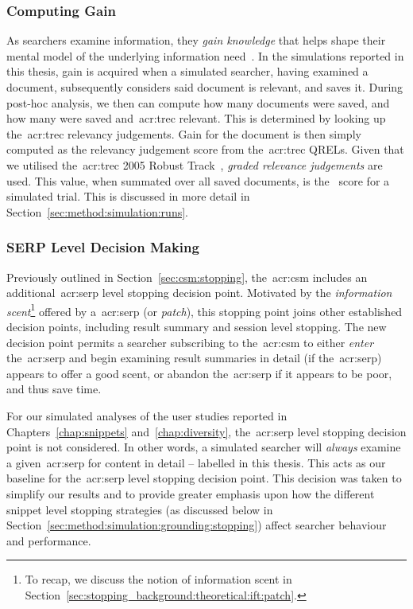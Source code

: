 \subsubsection{Computing Gain}\label{sec:method:simulation:grounding:gain}
As searchers examine information, they \emph{gain knowledge} that helps shape their mental model of the underlying information need~\citep{nickles1995judgment}. In the simulations reported in this thesis, gain is acquired when a simulated searcher, having examined a document, subsequently considers said document is relevant, and saves it. During post-hoc analysis, we then can compute how many documents were saved, and how many were saved and~\gls{acr:trec} relevant. This is determined by looking up the~\gls{acr:trec} relevancy judgements. Gain for the document is then simply computed as the relevancy judgement score from the~\gls{acr:trec} QRELs. Given that we utilised the~\gls{acr:trec} 2005 Robust Track~\citep{voorhees2005trec_book}, \emph{graded relevance judgements} are used. This value, when summated over all saved documents, is the~ score for a simulated trial. This is discussed in more detail in Section~\ref{sec:method:simulation:runs}.

\vspace*{-2mm}
\subsubsection{SERP Level Decision Making}\label{sec:method:simulation:grounding:serp}
Previously outlined in Section~\ref{sec:csm:stopping}, the~\gls{acr:csm} includes an additional~\gls{acr:serp} level stopping decision point. Motivated by the \emph{information scent}\footnote{To recap, we discuss the notion of information scent in Section~\ref{sec:stopping_background:theoretical:ift:patch}.} offered by a~\gls{acr:serp} (or \emph{patch}), this stopping point joins other established decision points, including result summary and session level stopping. The new decision point permits a searcher subscribing to the~\gls{acr:csm} to either \emph{enter} the~\gls{acr:serp} and begin examining result summaries in detail (if the~\gls{acr:serp}) appears to offer a good scent, or abandon the~\gls{acr:serp} if it appears to be poor, and thus save time.

For our simulated analyses of the user studies reported in Chapters~\ref{chap:snippets} and~\ref{chap:diversity}, the~\gls{acr:serp} level stopping decision point is not considered. In other words, a simulated searcher will \emph{always} examine a given~\gls{acr:serp} for content in detail -- labelled  in this thesis. This acts as our baseline for the~\gls{acr:serp} level stopping decision point. This decision was taken to simplify our results and to provide greater emphasis upon how the different snippet level stopping strategies (as discussed below in Section~\ref{sec:method:simulation:grounding:stopping}) affect searcher behaviour and performance.

